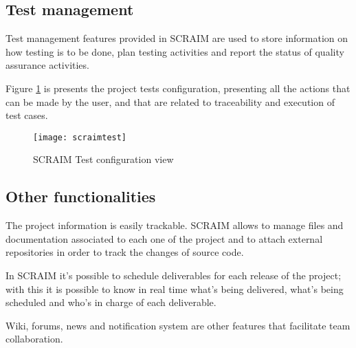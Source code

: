 \subsection{Test management}
Test management features provided in SCRAIM are used to store information on how testing is to be done, plan testing activities and report the status of quality assurance activities.

Figure \ref{fig:scraimtest} is presents the project tests configuration, presenting all the actions that can be made by the user, and that are related to traceability and execution of test cases.

\begin{figure}[h]
	\begin{center}
		\leavevmode
		\texttt{[image: scraimtest]}
		\caption{SCRAIM Test configuration view}
		\label{fig:scraimtest}
	\end{center}
\end{figure}


\subsection{Other functionalities}
The project information is easily trackable. SCRAIM allows  to manage files and documentation associated to each one of the project and to attach external repositories in order to track the changes of source code.

In SCRAIM it's possible to schedule deliverables for each release of the project; with this it is possible to know in real time what's being delivered, what's being scheduled and who's in charge of each deliverable.

Wiki, forums, news and notification system are other features that facilitate team collaboration.